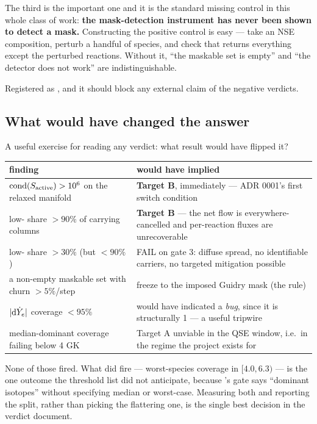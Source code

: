 The third is the important one and it is the standard missing control in this
whole class of work: \textbf{the mask-detection instrument has never been shown
to detect a mask.} Constructing the positive control is easy --- take an NSE
composition, perturb a handful of species, and check that 
returns everything except the perturbed reactions. Without it, ``the maskable
set is empty'' and ``the detector does not work'' are indistinguishable.

Registered as , and it should block any external claim of the
negative verdicts.

\subsection{What would have changed the answer}
\label{sec:whatwouldflip}

A useful exercise for reading any verdict: what result would have flipped it?

\begingroup\small
\begin{tabularx}{\textwidth}{@{}L{5.6cm} Y@{}}
\toprule
\textbf{finding} & \textbf{would have implied} \\
\midrule
$\operatorname{cond}(S_{\mathrm{active}}) > 10^{6}$ on the relaxed manifold & \textbf{Target B},
  immediately --- ADR 0001's first switch condition \\
low-\kap{} share $> 90\%$ of carrying columns & \textbf{Target B} --- the net
  flow is everywhere-cancelled and per-reaction fluxes are unrecoverable \\
low-\kap{} share $> 30\%$ (but $< 90\%$) & FAIL on gate 3: diffuse spread, no
  identifiable carriers, no targeted mitigation possible \\
a non-empty maskable set with churn $> 5\%$/step & freeze to the imposed
  Guidry mask (the  rule) \\
$|\mathrm{d}\dot Y_{e}|$ coverage $< 95\%$ & would have indicated a \emph{bug}, since it
  is structurally 1 --- a useful tripwire \\
median-dominant coverage failing below 4 GK & Target A unviable in the QSE
  window, i.e.\ in the regime the project exists for \\
\bottomrule
\end{tabularx}
\endgroup

None of those fired. What did fire --- worst-species coverage in $[4.0, 6.3)$
--- is the one outcome the threshold list did not anticipate, because
's gate says ``dominant isotopes'' without specifying median or
worst-case. Measuring both and reporting the split, rather than picking the
flattering one, is the single best decision in the verdict document.

